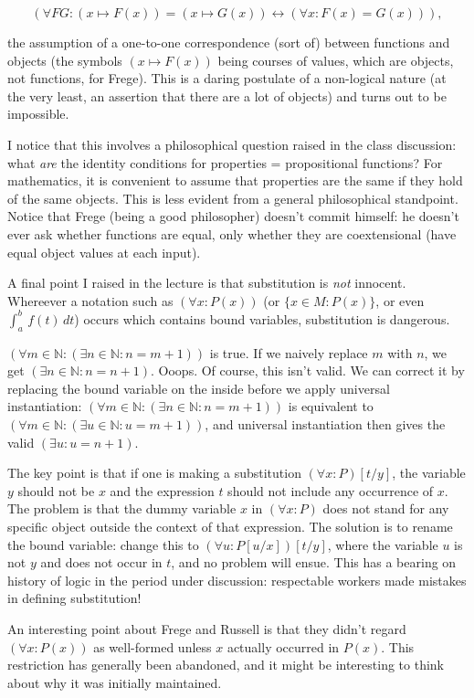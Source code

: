 \documentclass[12pt]{article}
\begin{document}
$$(\forall FG:(x \mapsto F(x)) = (x \mapsto G(x)) \leftrightarrow (\forall x:F(x) =G(x))),$$

the assumption of a one-to-one correspondence (sort of) between functions and objects (the symbols $(x \mapsto F(x))$ being courses of values, which are objects, not functions, for Frege).  This is a daring postulate of a non-logical nature (at the very least, an assertion that there are a lot of objects) and turns out to be impossible.

I notice that this involves a philosophical question raised in the class discussion:  what {\em are\/} the identity conditions for properties = propositional functions?  For mathematics, it is convenient to assume that properties are the same if they hold of the same objects.  This is less evident from a general philosophical standpoint.  Notice that Frege (being a good philosopher) doesn't commit himself:  he doesn't ever ask whether functions are equal, only whether they are coextensional (have equal object values at each input).

A final point I raised in the lecture is that substitution is {\em not\/} innocent.  Whereever a notation such as $(\forall x:P(x))$
(or $\{x \in M:P(x)\}$, or even $\int_a^b\, f(t)\,dt$) occurs which contains bound variables, substitution is dangerous.

$(\forall m \in {\mathbb N}:(\exists n \in {\mathbb N}:n = m+1))$ is true.  If we naively replace $m$ with $n$, we get
$(\exists n\in {\mathbb N}:n = n+1)$.  Ooops.  Of course, this isn't valid.  We can correct it by replacing the bound variable
on the inside before we apply universal instantiation:  $(\forall m \in {\mathbb N}:(\exists n \in {\mathbb N}:n = m+1))$ is equivalent to $(\forall m \in {\mathbb N}:(\exists u \in {\mathbb N}:u = m+1))$, and universal instantiation then gives the valid
$(\exists u:u = n+1)$.

The key point is that if one is making a substitution $(\forall x:P)[t/y]$, the variable $y$ should not be $x$ and the expression $t$ should not include any occurrence of $x$.  The problem is that the dummy variable $x$ in $(\forall x:P)$ does not stand for any specific object outside the context of that expression.  The solution is to rename the bound variable:  change this to
$(\forall u:P[u/x])[t/y]$, where the variable $u$ is not $y$ and does not occur in $t$, and no problem will ensue.  This has a bearing on history of logic in the period under discussion:  respectable workers made mistakes in defining substitution!

An interesting point about Frege and Russell is that they didn't regard $(\forall x:P(x))$ as well-formed unless $x$ actually occurred in $P(x)$.  This restriction has generally been abandoned, and it might be interesting to think about why it was initially maintained.
\end{document}
